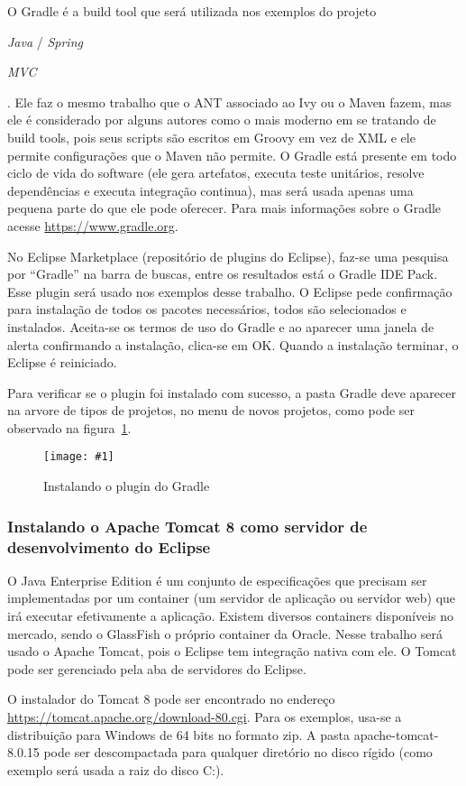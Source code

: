 \documentclass[a4paper,12pt]{article}
\newcommand{\spring} {
	\lang{Java}/\est{Spring} \sigla{MVC}
}
\newcommand{\figura}[3] {
	\begin{figure}[H]
		\centering
		\texttt{[image: \#1]}
		\caption{#2}
		\label{#3}
	\end{figure}
	\FloatBarrier
}
\newcommand{\est}[1] {
	\textit{#1}
}
\newcommand{\sigla}[1] {
	\textit{#1}
}
\newcommand{\lang}[1] {
	\textit{#1}
}
\begin{document}
O Gradle é a build tool que será utilizada nos exemplos do projeto \spring. Ele faz o mesmo trabalho que o ANT associado ao Ivy ou o Maven fazem, mas ele é considerado por alguns autores como o mais moderno em se tratando de build tools, pois seus scripts são escritos em Groovy em vez de XML e ele permite configurações que o Maven não permite. O Gradle está presente em todo ciclo de vida do software (ele gera artefatos, executa teste unitários, resolve dependências e executa integração continua), mas será usada apenas uma pequena parte do que ele pode oferecer. Para mais informações sobre o Gradle acesse \url{https://www.gradle.org}. 

No Eclipse Marketplace (repositório de plugins do Eclipse), faz-se uma pesquisa por “Gradle” na barra de buscas, entre os resultados está o Gradle IDE Pack. Esse plugin será usado nos exemplos desse trabalho. O Eclipse pede confirmação para instalação de todos os pacotes necessários, todos são selecionados e instalados. Aceita-se os termos de uso do Gradle e ao aparecer uma janela de alerta confirmando a instalação, clica-se em OK. Quando a instalação terminar, o Eclipse é reiniciado.

Para verificar se o plugin foi instalado com sucesso, a pasta Gradle deve aparecer na arvore de tipos de projetos, no menu de novos projetos, como pode ser observado na figura~\ref{fig:gradle1}.

\figura{plugin1.png}{Instalando o plugin do Gradle}{fig:gradle1}

\subsubsection{Instalando o Apache Tomcat 8 como servidor de desenvolvimento do Eclipse} 

O Java Enterprise Edition é um conjunto de especificações que precisam ser implementadas por um container (um servidor de aplicação ou servidor web) que irá executar efetivamente a aplicação. Existem diversos containers disponíveis no mercado, sendo o GlassFish o próprio container da Oracle. Nesse trabalho será usado o Apache Tomcat, pois o Eclipse tem integração nativa com ele. O Tomcat pode ser gerenciado pela aba de servidores do Eclipse.

O instalador do Tomcat 8 pode ser encontrado no endereço \url{https://tomcat.apache.org/download-80.cgi}. Para os exemplos, usa-se a distribuição para Windows de 64 bits no formato zip. A pasta apache-tomcat-8.0.15 pode ser descompactada para qualquer diretório no disco rígido (como exemplo será usada a raiz do disco C:).  
\end{document}

